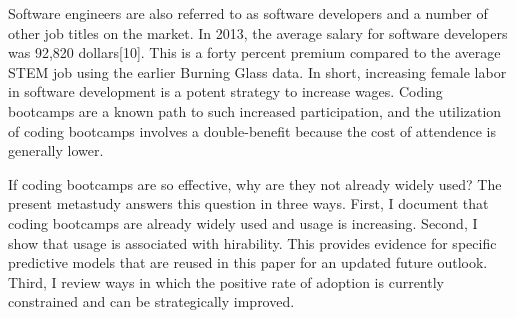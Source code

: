 \documentclass[review]{elsarticle}
\begin{document}
Software engineers are also referred to as software developers and a number of other job titles on the market.
In 2013, the average salary for software developers was 92,820 dollars[10].
This is a forty percent premium compared to the average STEM job using the earlier Burning Glass data.
In short, increasing female labor in software development is a potent strategy to increase wages.
Coding bootcamps are a known path to such increased participation, and the utilization of coding bootcamps
involves a double-benefit because the cost of attendence is generally lower.

If coding bootcamps are so effective, why are they not already widely used?
The present metastudy answers this question in three ways.
First, I document that coding bootcamps are already widely used and usage is increasing.
Second, I show that usage is associated with hirability.
This provides evidence for specific predictive models that are reused in this paper for an updated future outlook.
Third, I review ways in which the positive rate of adoption is currently constrained and can be strategically improved.


\end{document}
